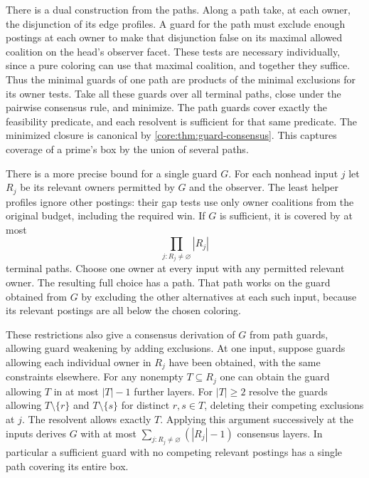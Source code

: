 There is a dual construction from the paths.
Along a path take, at each owner, the disjunction
of its edge profiles. A guard for the path must
exclude enough postings at each owner to make
that disjunction false on its maximal allowed
coalition on the head's observer facet. These tests are necessary individually,
since a pure coloring can use that maximal coalition,
and together they suffice. Thus the minimal guards
of one path are products of the minimal exclusions
for its owner tests. Take all these guards over all
terminal paths, close under the pairwise consensus
rule, and minimize. The path guards cover exactly
the feasibility predicate, and each resolvent is
sufficient for that same predicate. The minimized
closure is canonical by
\cref{core:thm:guard-consensus}. This captures coverage
of a prime's box by the union of several paths.

There is a more precise bound for a single guard $G$.
For each nonhead input $j$ let $R_j$ be its relevant
owners permitted by $G$ and the observer. The least
helper profiles ignore other postings: their gap tests
use only owner coalitions from the original budget,
including the required win. If $G$ is sufficient, it
is covered by at most
\[
             \prod_{j:R_j\ne\varnothing}|R_j|
\]
terminal paths. Choose one owner at every input with
any permitted relevant owner. The resulting full
choice has a path. That path works on the guard
obtained from $G$ by excluding the other alternatives
at each such input, because its relevant postings
are all below the chosen coloring.

These restrictions also give a consensus derivation
of $G$ from path guards, allowing guard weakening by
adding exclusions. At one input, suppose guards
allowing each individual owner in $R_j$ have been
obtained, with the same constraints elsewhere.
For any nonempty $T\subseteq R_j$ one can obtain
the guard allowing $T$ in at most $|T|-1$ further
layers. For $|T|\ge2$ resolve the guards allowing
$T\setminus\{r\}$ and $T\setminus\{s\}$ for
distinct $r,s\in T$, deleting their competing
exclusions at $j$. The resolvent allows exactly
$T$. Applying this argument successively at the
inputs derives $G$ with at most
$\sum_{j:R_j\ne\varnothing}(|R_j|-1)$ consensus
layers. In particular a sufficient guard with
no competing relevant postings has a single
path covering its entire box.

